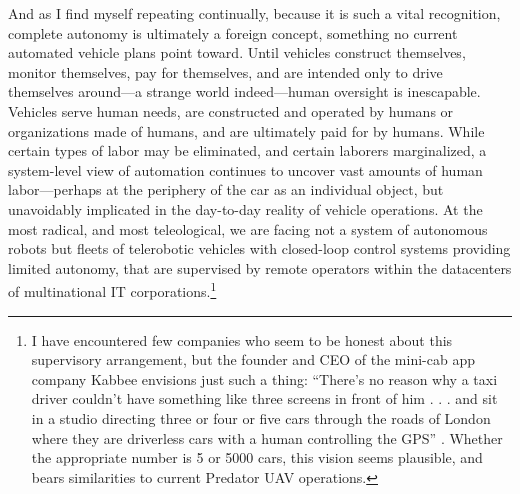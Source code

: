 And as I find myself repeating continually, because it is such a vital
recognition, complete autonomy is ultimately a foreign concept,
something no current automated vehicle plans point toward. Until
vehicles construct themselves, monitor themselves, pay for themselves,
and are intended only to drive themselves around---a strange world
indeed---human oversight is inescapable. Vehicles serve human needs,
are constructed and operated by humans or organizations made of
humans, and are ultimately paid for by humans. While certain types of
labor may be eliminated, and certain laborers marginalized, a
system-level view of automation continues to uncover vast amounts of
human labor---perhaps at the periphery of the car as an individual
object, but unavoidably implicated in the day-to-day reality of
vehicle operations. At the most radical, and most teleological, we are
facing not a system of autonomous robots but fleets of telerobotic
vehicles with closed-loop control systems providing limited autonomy,
that are supervised by remote operators within the datacenters of
multinational IT corporations.\footnote{I have encountered few
  companies who seem to be honest about this supervisory arrangement,
  but the founder and CEO of the mini-cab app company Kabbee envisions
just such a thing: ``There’s no reason why a taxi driver couldn't have
something like three screens in front of him . . . and sit in a studio
directing three or four or five cars through the roads of London where
they are driverless cars with a human controlling the GPS''
\cite{???-http://www.forbes.com/sites/freddiedawson/2015/03/31/how-far-away-is-driverless-technology-really/}.
Whether the appropriate number is 5 or 5000 cars, this vision seems
plausible, and bears similarities to current Predator UAV operations.}



